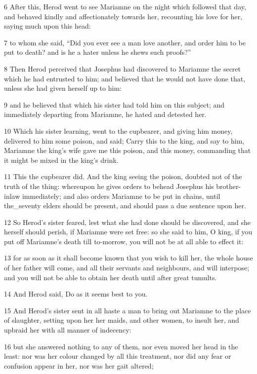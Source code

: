 6 After this, Herod went to see Mariamne on the night which followed that day, and behaved kindly and affectionately towards her, recounting his love for her, saying much upon this head: 

7 to whom she said, “Did you ever see a man love another, and order him to be put to death? and is he a hater unless he shews such proofs?” 

8 Then Herod perceived that Josephus had discovered to Mariamne the secret which he had entrusted to him; and believed that he would not have done that, unless she had given herself up to him: 

9 and he believed that which his sister had told him on this subject; and immediately departing from Mariamne, he hated and detested her. 

10 Which his sister learning, went to the cupbearer, and giving him money, delivered to him some poison, and said; Carry this to the king, and say to him, Mariamne the king’s wife gave me this poison, and this money, commanding that it might be mixed in the king’s drink. 

11 This the cupbearer did. And the king seeing the poison, doubted not of the truth of the thing: whereupon he gives orders to behead Josephus his brother-inlaw immediately; and also orders Mariamne to be put in chains, until the_seventy elders should be present, and should pass a due sentence upon her. 

12 So Herod’s sister feared, lest what she had done should be discovered, and she herself should perish, if Mariamne were set free: so she said to him, O king, if you put off Mariamne’s death till to-morrow, you will not be at all able to effect it: 

13 for as soon as it shall become known that you wish to kill her, the whole house of her father will come, and all their servants and neighbours, and will interpose; and you will not be able to obtain her death until after great tumults. 

14 And Herod said, Do as it seems best to you. 

15 And Herod’s sister sent in all haste a man to bring out Mariamne to the place of slaughter, setting upon her her maids, and other women, to insult her, and upbraid her with all manner of indecency: 

16 but she answered nothing to any of them, nor even moved her head in the least: nor was her colour changed by all this treatment, nor did any fear or confusion appear in her, nor was her gait altered; 

